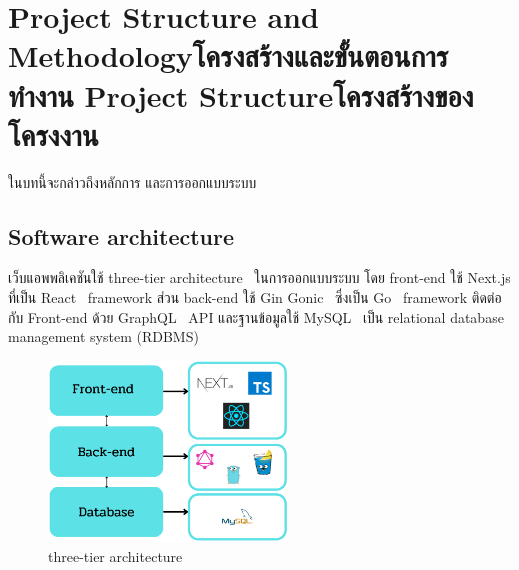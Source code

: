 \chapter{\ifproject%
\ifenglish Project Structure and Methodology\else โครงสร้างและขั้นตอนการทำงาน\fi
\else%
\ifenglish Project Structure\else โครงสร้างของโครงงาน\fi
\fi
}

ในบทนี้จะกล่าวถึงหลักการ และการออกแบบระบบ

\makeatletter


\makeatother

\section{Software architecture}
เว็บแอพพลิเคชันใช้ three-tier architecture~\cite{ttarch} ในการออกแบบระบบ โดย front-end ใช้ Next.js\cite{nextjs} 
ที่เป็น React~\cite{react} framework ส่วน back-end ใช้ Gin Gonic~\cite{gingonic} ซึ่งเป็น Go~\cite{golang} framework ติดต่อกับ Front-end 
ด้วย GraphQL~\cite{graphql} API และฐานข้อมูลใช้ MySQL~\cite{mysql} เป็น relational database management system (RDBMS)
\begin{figure}[h]
\begin{center}
\includegraphics[width=2.5in]{photo/threetierarch.png}
\end{center}
\caption{three-tier architecture}
\label{fig:three-tier}
\end{figure}

